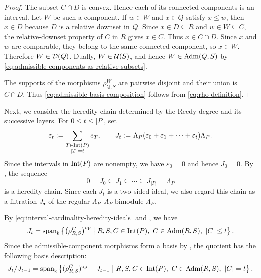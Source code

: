 \begin{proof}
The subset $C\cap D$ is convex.  Hence each of its connected components
is an interval.  Let $W$ be such a component.  If $w\in W$ and $x\in Q$
satisfy $x\leq w$, then $x\in D$ because $D$ is a relative downset in
$Q$.  Since $x\in D\subseteq R$ and $w\in W\subseteq C$, the
relative-downset property of $C$ in $R$ gives $x\in C$.  Thus
$x\in C\cap D$.  Since $x$ and $w$ are comparable, they belong to the
same connected component, so $x\in W$.  Therefore $W\in\mathcal D(Q)$.
Dually, $W\in\mathcal U(S)$, and hence $W\in\operatorname{Adm}(Q,S)$ by
\eqref{eq:admissible-components-as-relative-subsets}.

The supports of the morphisms $\rho_{Q,S}^{W}$ are pairwise disjoint
and their union is $C\cap D$.  Thus
\eqref{eq:admissible-basis-composition} follows from
\eqref{eq:rho-definition}.
\end{proof}





Next, we consider the heredity chain determined by the Reedy degree and its
successive layers. For $0\leq t\leq |P|$, set
\begin{equation}
\varepsilon_t
:=
\sum_{\substack{T\in\operatorname{Int}(P)\\ |T|=t}} e_T,
\qquad
J_t
:=
\Lambda_P
(\varepsilon_0+\varepsilon_1+\cdots+\varepsilon_t)
\Lambda_P.
\label{eq:interval-cardinality-heredity-ideals}
\end{equation}
Since the intervals in $\operatorname{Int}(P)$ are nonempty, we have
$\varepsilon_0=0$ and hence $J_0=0$. By
\cite[Corollary~4.8]{CDK}, the sequence
\begin{equation}
0
=
J_0
\subseteq
J_1
\subseteq
\cdots
\subseteq
J_{|P|}
=
\Lambda_P
\label{eq:interval-cardinality-heredity-chain}
\end{equation}
is a heredity chain.
Since each $J_t$ is a two-sided ideal, we also regard this chain as a
filtration $J_\bullet$ of the regular
$\Lambda_P$--$\Lambda_P$-bimodule $\Lambda_P$.

By \eqref{eq:interval-cardinality-heredity-ideals} and
, we have
\begin{equation}
J_t
=
\operatorname{span}_{\mathsf{k}}
\left\{
\bigl(\rho_{R,S}^{C}\bigr)^{\mathrm{op}}
\;\middle|\;
R,S,C\in\operatorname{Int}(P),\
C\in\operatorname{Adm}(R,S),\
|C|\leq t
\right\}.
\label{eq:interval-cardinality-admissible-basis-filtration}
\end{equation}
Since the admissible-component morphisms form a basis by
, the quotient has the following basis description: 
\begin{equation}
J_t/J_{t-1}
=
\operatorname{span}_{\mathsf{k}}
\left\{
(\rho_{R,S}^{C})^{\mathrm{op}}+J_{t-1}
\;\middle|\;
R,S,C\in\operatorname{Int}(P),\
C\in\operatorname{Adm}(R,S),\
|C|=t
\right\}.
\label{eq:interval-cardinality-admissible-basis-layer}
\end{equation}





